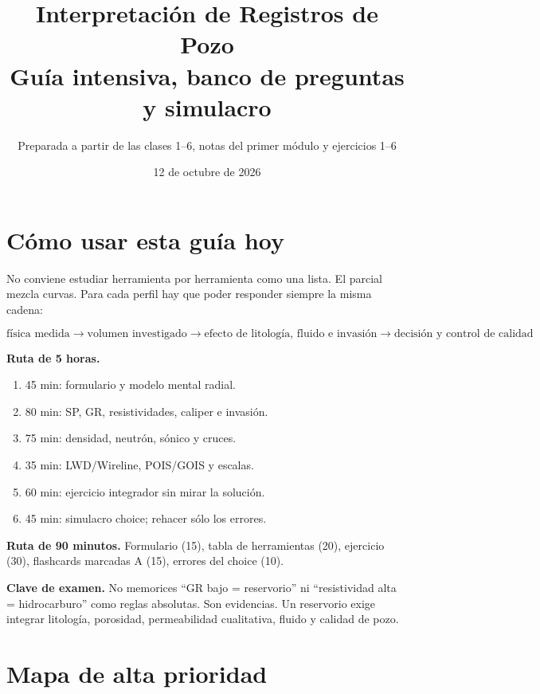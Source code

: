 \documentclass[10.5pt,a4paper]{article}
\title{Interpretaci\'on de Registros de Pozo\\[0.25em]\large Gu\'ia intensiva, banco de preguntas y simulacro}
\author{Preparada a partir de las clases 1--6, notas del primer m\'odulo y ejercicios 1--6}
\date{12 de octubre de 2026}
\newcommand{\clave}[1]{\par\colorbox{gris}{\parbox{0.965\linewidth}{\textbf{Clave de examen.} #1}}\par}
\begin{document}
\maketitle
\tableofcontents
\newpage

\section*{C\'omo usar esta gu\'ia hoy}

No conviene estudiar herramienta por herramienta como una lista. El parcial mezcla curvas. Para cada perfil hay que poder responder siempre la misma cadena:

\[
\boxed{\text{f\'isica medida}}
\longrightarrow
\boxed{\text{volumen investigado}}
\longrightarrow
\boxed{\text{efecto de litolog\'ia, fluido e invasi\'on}}
\longrightarrow
\boxed{\text{decisi\'on y control de calidad}}
\]

\textbf{Ruta de 5 horas.}
\begin{enumerate}
  \item 45 min: formulario y modelo mental radial.
  \item 80 min: SP, GR, resistividades, caliper e invasi\'on.
  \item 75 min: densidad, neutr\'on, s\'onico y cruces.
  \item 35 min: LWD/Wireline, POIS/GOIS y escalas.
  \item 60 min: ejercicio integrador sin mirar la soluci\'on.
  \item 45 min: simulacro choice; rehacer s\'olo los errores.
\end{enumerate}

\textbf{Ruta de 90 minutos.} Formulario (15), tabla de herramientas (20), ejercicio (30), flashcards marcadas A (15), errores del choice (10).

\clave{No memorices ``GR bajo = reservorio'' ni ``resistividad alta = hidrocarburo'' como reglas absolutas. Son evidencias. Un reservorio exige integrar litolog\'ia, porosidad, permeabilidad cualitativa, fluido y calidad de pozo.}

\section{Mapa de alta prioridad}
\end{document}
